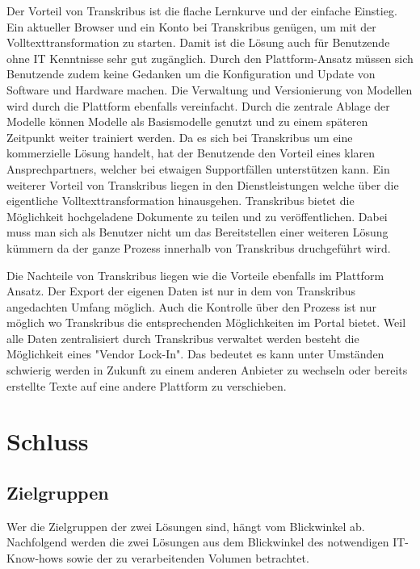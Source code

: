 \documentclass[a4paper,oneside, 12pt]{report}
\begin{document}
Der Vorteil von Transkribus ist die flache Lernkurve und der einfache Einstieg. Ein aktueller Browser und ein Konto bei Transkribus genügen, um mit der Volltexttransformation zu starten. Damit ist die Lösung auch für Benutzende ohne IT Kenntnisse sehr gut zugänglich. Durch den Plattform-Ansatz müssen sich Benutzende zudem keine Gedanken um die Konfiguration und Update von Software und Hardware machen. Die Verwaltung und Versionierung von Modellen wird durch die Plattform ebenfalls vereinfacht. Durch die zentrale Ablage der Modelle können Modelle als Basismodelle genutzt und zu einem späteren Zeitpunkt weiter trainiert werden. Da es sich bei Transkribus um eine kommerzielle Lösung handelt, hat der Benutzende den Vorteil eines klaren Ansprechpartners, welcher bei etwaigen Supportfällen unterstützen kann. Ein weiterer Vorteil von Transkribus liegen in den Dienstleistungen welche über die eigentliche Volltexttransformation hinausgehen. Transkribus bietet die Möglichkeit hochgeladene Dokumente zu teilen und zu veröffentlichen. Dabei muss man sich als Benutzer nicht um das Bereitstellen einer weiteren Lösung kümmern da der ganze Prozess innerhalb von Transkribus druchgeführt wird.

Die Nachteile von Transkribus liegen wie die Vorteile ebenfalls im Plattform Ansatz. Der Export der eigenen Daten ist nur in dem von Transkribus angedachten Umfang möglich. Auch die Kontrolle über den Prozess ist nur möglich wo Transkribus die entsprechenden Möglichkeiten im Portal bietet. Weil alle Daten zentralisiert durch Transkribus verwaltet werden besteht die Möglichkeit eines "Vendor Lock-In". Das bedeutet es kann unter Umständen schwierig werden in Zukunft zu einem anderen Anbieter zu wechseln oder bereits erstellte Texte auf eine andere Plattform zu verschieben.

\chapter{Schluss}\label{sec:schluss}

\section{Zielgruppen}
Wer die Zielgruppen der zwei Lösungen sind, hängt vom Blickwinkel ab. Nachfolgend werden die zwei Lösungen aus dem Blickwinkel des notwendigen IT-Know-hows sowie der zu verarbeitenden Volumen betrachtet.
\end{document}
